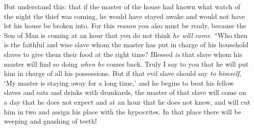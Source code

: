 \begin{biblechapter}
\verse But understand this: that if the master of the house had known what watch of the night the thief was coming, he would have stayed awake and would not have let his house be broken into.
\verse For this \textit{reason} you also must be ready, because the Son of Man is coming at an hour that you do not think \textit{he will come}.
 “Who then is the faithful and wise slave whom the master has put in charge of his household slaves to give them their food at the right time?
\verse Blessed \textit{is} that slave whom his master will find so doing \textit{when he} comes back.
\verse Truly I say to you that he will put him in charge of all his possessions.
\verse But if that evil slave should say \textit{to himself}, ‘My master is staying away for a long time,’
\verse and he begins to beat his fellow slaves and eats and drinks with drunkards,
\verse the master of that slave will come on a day that he does not expect and at an hour that he does not know,
\verse and will cut him in two and assign his place with the hypocrites. In that place there will be weeping and gnashing of teeth!
\end{biblechapter}

